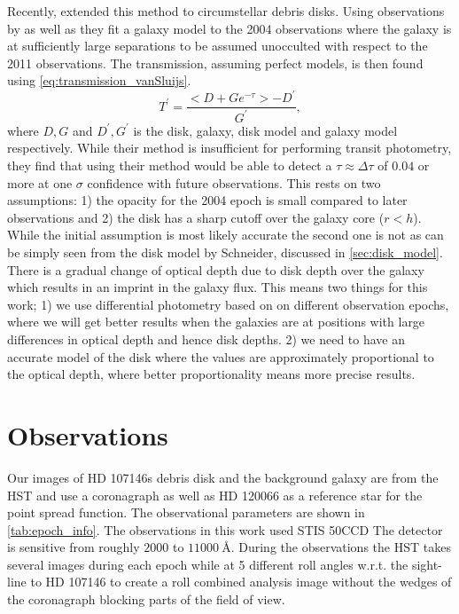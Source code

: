 \documentclass{aa}
\begin{document}
Recently, \cite{vanSluijs2018feasibility} extended this method to circumstellar debris disks. Using observations by \cite{ardila2004, ardila2005} as well as \cite{schneider2014probing} they fit a galaxy model to the 2004 observations where the galaxy is at sufficiently large separations to be assumed unocculted with respect to the 2011 observations. The transmission, assuming perfect models, is then found using \autoref{eq:transmission_vanSluijs}.
\begin{equation}
\label{eq:transmission_vanSluijs}
    T^{\prime}=\frac{<D+G e^{-\tau}>-D^{\prime}}{G^{\prime}},
\end{equation}
where $D, G$ and $D^{\prime},G^{\prime}$ is the disk, galaxy, disk model and galaxy model respectively. 
While their method is insufficient for performing transit photometry, they find that using their method would be able to detect a $\tau \approx \Delta\tau$ of $0.04$ or more at one $\sigma$ confidence with future observations. This rests on two assumptions: 1) the opacity for the 2004 epoch is small compared to later observations and 2) the disk has a sharp cutoff over the galaxy core ($r<h$). While the initial assumption is most likely accurate the second one is not as can be simply seen from the disk model by Schneider\cite{schneiderdisk}, discussed in \autoref{sec:disk_model}. There is a gradual change of optical depth due to disk depth over the galaxy which results in an imprint in the galaxy flux. 
This means two things for this work; 1) we use differential photometry based on on different observation epochs, where we will get better results when the galaxies are at positions with large differences in optical depth and hence disk depths. 2) we need to have an accurate model of the disk where the values are approximately proportional to the optical depth, where better proportionality means more precise results.

\section{Observations}
\label{sec:observations}

Our images of HD 107146s debris disk and the background galaxy are from the HST and use a coronagraph as well as HD 120066 as a reference star for the point spread function. The observational parameters are shown in \autoref{tab:epoch_info}. 
The observations in this work used STIS 50CCD The detector is sensitive from roughly $2000$ to $11000 ~\si{\angstrom}$.
During the observations the HST takes several images during each epoch while at 5 different roll angles w.r.t. the sight-line to HD 107146 to create a roll combined analysis image without the wedges of the coronagraph blocking parts of the field of view.
\end{document}
